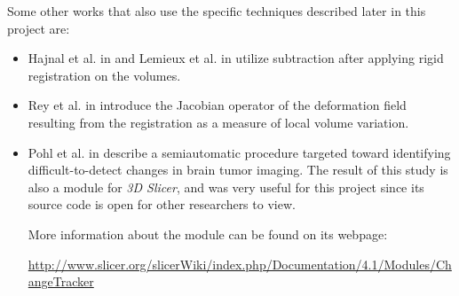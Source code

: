 Some other works that also use the specific techniques described later in this project are:
\begin{itemize}
\item Hajnal et al. in \cite{hajnal} and Lemieux et al. in \cite{lemieux} utilize subtraction after applying rigid registration on the volumes.
\item Rey et al. in \cite{rey} introduce the Jacobian operator of the deformation field resulting from the registration as a measure of local volume variation.
\item Pohl et al. in \cite{pohlCT} describe a semiautomatic procedure targeted toward identifying difficult-to-detect changes in brain tumor imaging. The result of this study is also a module for \textit{3D Slicer}, and was very useful for this project since its source code is open for other researchers to view. 

More information about the module can be found on its webpage: 

\url{http://www.slicer.org/slicerWiki/index.php/Documentation/4.1/Modules/ChangeTracker}
\end{itemize}


